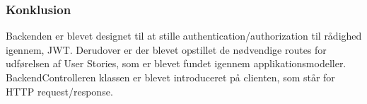 \subsubsection{Konklusion}

Backenden er blevet designet til at stille authentication/authorization til rådighed igennem, JWT. Derudover er der blevet opstillet de nødvendige routes for udførelsen af User Stories, som er blevet fundet igennem applikationsmodeller. BackendControlleren klassen er blevet introduceret på clienten, som står for HTTP request/response.\\ 


\newpage
